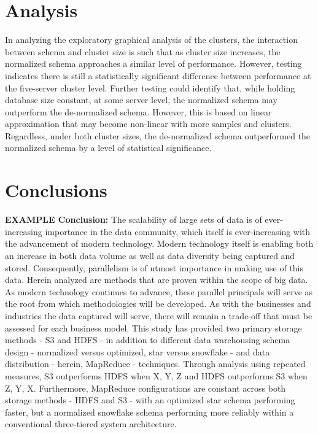 \documentclass[journal]{IEEEtran}
\begin{document}
\section{Analysis}

In analyzing the exploratory graphical analysis of the clusters, 
 the interaction between schema and cluster size is such that as cluster size increases,
 the normalized schema approaches a similar level of performance. 
However, testing indicates there is still a statistically significant difference between 
 performance at the five-server cluster level. 
Further testing could identify that, while holding database size constant, at some server level, 
 the normalized schema may outperform the de-normalized schema. 
However, this is based on linear approximation that may become non-linear with more samples and clusters. 
Regardless, under both cluster sizes,
 the de-normalized schema outperformed the normalized schema by a level of statistical significance.

\section{Conclusions}

\textbf{EXAMPLE Conclusion:}
The scalability of large sets of data is of ever-increasing importance in the data community, which itself is ever-increasing with the advancement of modern technology. Modern technology itself is enabling both an increase in both data volume as well as data diversity being captured and stored. Consequently, parallelism is of utmost importance in making use of this data. Herein analyzed are methods that are proven within the scope of big data. As modern technology continues to advance, these parallel principals will serve as the root from which methodologies will be developed. As with the businesses and industries the data captured will serve, there will remain a trade-off that must be assessed for each business model. This study has provided two primary storage methods - S3 and HDFS - in addition to different data warehousing schema design - normalized versus optimized, star versus snowflake - and data distribution - herein, MapReduce - techniques. Through analysis using repeated measures, S3 outperforms HDFS when X, Y, Z and HDFS outperforms S3 when Z, Y, X. Furthermore, MapReduce configurations are constant across both storage methods - HDFS and S3 - with an optimized star schema performing faster, but a normalized snowflake schema performing more reliably within a conventional three-tiered system architecture.
\end{document}

